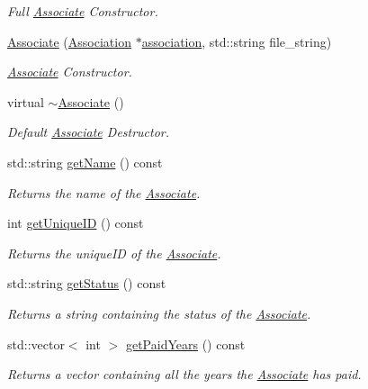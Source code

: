 \begin{DoxyCompactItemize}
\begin{DoxyCompactList}\small\item\em Full \mbox{\hyperlink{classAssociate}{Associate}} Constructor. \end{DoxyCompactList}\item 
\mbox{\hyperlink{classAssociate_a6265187f56438fd128bb56ad67bab04f}{Associate}} (\mbox{\hyperlink{classAssociation}{Association}} $\ast$\mbox{\hyperlink{classAssociate_a7871837a4c80adb4e39f2f67ae1bfce5}{association}}, std\+::string file\+\_\+string)
\begin{DoxyCompactList}\small\item\em \mbox{\hyperlink{classAssociate}{Associate}} Constructor. \end{DoxyCompactList}\item 
virtual \mbox{\hyperlink{classAssociate_ae7f51b6f8b7e33af9e5218a2c7319a32}{$\sim$\+Associate}} ()
\begin{DoxyCompactList}\small\item\em Default \mbox{\hyperlink{classAssociate}{Associate}} Destructor. \end{DoxyCompactList}\item 
std\+::string \mbox{\hyperlink{classAssociate_a85601dd07022fc20f76f9f761fdcec6a}{get\+Name}} () const
\begin{DoxyCompactList}\small\item\em Returns the name of the \mbox{\hyperlink{classAssociate}{Associate}}. \end{DoxyCompactList}\item 
int \mbox{\hyperlink{classAssociate_aaca11bf6dea5df3710931898e00a0944}{get\+Unique\+ID}} () const
\begin{DoxyCompactList}\small\item\em Returns the unique\+ID of the \mbox{\hyperlink{classAssociate}{Associate}}. \end{DoxyCompactList}\item 
std\+::string \mbox{\hyperlink{classAssociate_a9f6109b8164cf8193f9fabd5ff2871f7}{get\+Status}} () const
\begin{DoxyCompactList}\small\item\em Returns a string containing the status of the \mbox{\hyperlink{classAssociate}{Associate}}. \end{DoxyCompactList}\item 
std\+::vector$<$ int $>$ \mbox{\hyperlink{classAssociate_ab3837d6afb9cba8e9f3213ca9b8368b9}{get\+Paid\+Years}} () const
\begin{DoxyCompactList}\small\item\em Returns a vector containing all the years the \mbox{\hyperlink{classAssociate}{Associate}} has paid. \end{DoxyCompactList}\item 

\end{DoxyCompactItemize}
